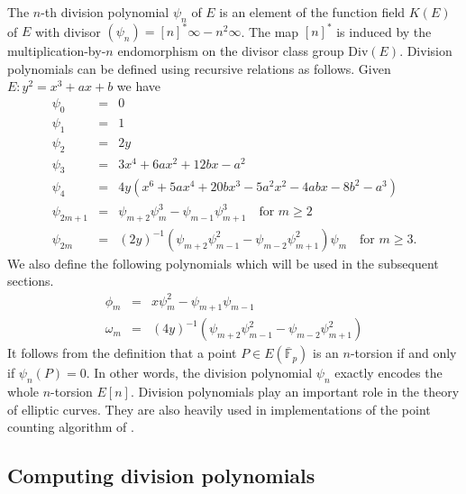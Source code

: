 \documentclass[11pt]{article}
\theoremstyle{plain}
\theoremstyle{definition}
\def\F{\ensuremath{\mathbb{F}}}
\begin{document}
The $n$-th division polynomial $\psi_n$ of $E$ is an element of the function field $K(E)$ of $E$ 
with divisor $(\psi_n) = [n]^*\infty - n^2\infty$. The map $[n]^*$ is induced by the 
multiplication-by-$n$ endomorphism on the divisor class group $\text{Div}(E)$. Division polynomials 
can be defined using recursive relations as follows. Given $E: y^2 = x^3 + ax + b$ we have
\begin{equation}
\label{equ:divpoly1}
	\begin{array}{rll}
		\psi_0 & = & 0 \\
		\psi_1 & = & 1 \\
		\psi_2 & = & 2y \\
		\psi_3 & = & 3x^4 + 6ax^2 + 12bx - a^2 \\
		\psi_4 & = & 4y(x^6 + 5ax^4 + 20bx^3 - 5a^2x^2 - 4abx - 8b^2 - a^3) \\
		\psi_{2m + 1} & = & \psi_{m + 2}\psi_m^3 - \psi_{m - 1}\psi_{m + 1}^3 \quad \text{for } m 
		\ge 2 \\
		\psi_{2m} & = & (2y)^{-1}(\psi_{m + 2}\psi_{m - 1}^2 - \psi_{m - 2}\psi_{m + 1}^2)\psi_m 
		\quad \text{for } m \ge 3.
	\end{array}
\end{equation}
We also define the following polynomials which will be used in the subsequent sections.
\begin{equation}
\label{equ:divpoly-extra}
	\begin{array}{rll}
		\phi_m & = & x\psi_m^2 - \psi_{m + 1}\psi_{m - 1} \\
		\omega_m & = & (4y)^{-1}(\psi_{m + 2}\psi_{m - 1}^2 - \psi_{m - 2}\psi_{m + 1}^2)
	\end{array}
\end{equation}
It follows from the definition that a point $P \in E(\overline{\F}_p)$ is an $n$-torsion if and 
only if $\psi_n(P) = 0$. In other words, the division polynomial $\psi_n$ exactly encodes the whole 
$n$-torsion $E[n]$. Division polynomials play an important role in the theory of elliptic 
curves. They are also heavily used in implementations of the point counting algorithm of 
\cite{schoof85}. 


\subsection{Computing division polynomials}
\end{document}
